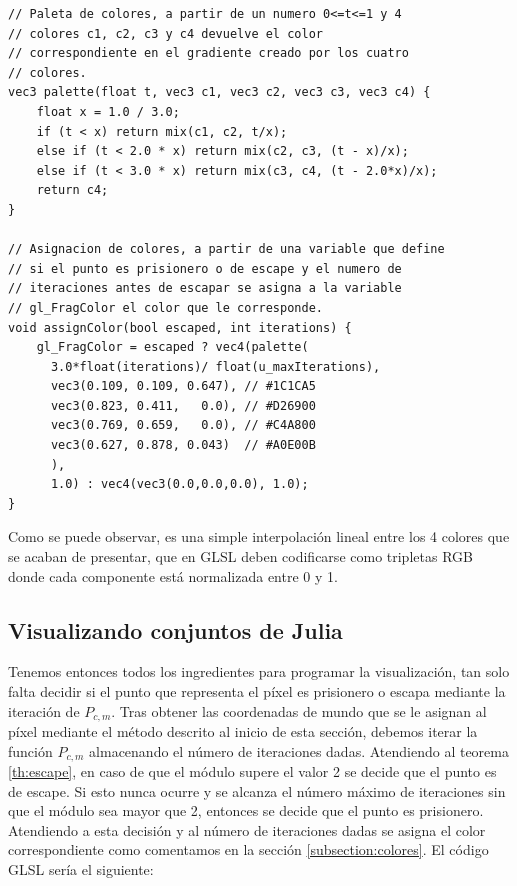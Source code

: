 \begin{lstlisting}
// Paleta de colores, a partir de un numero 0<=t<=1 y 4 
// colores c1, c2, c3 y c4 devuelve el color 
// correspondiente en el gradiente creado por los cuatro 
// colores.
vec3 palette(float t, vec3 c1, vec3 c2, vec3 c3, vec3 c4) {
    float x = 1.0 / 3.0;
    if (t < x) return mix(c1, c2, t/x);
    else if (t < 2.0 * x) return mix(c2, c3, (t - x)/x);
    else if (t < 3.0 * x) return mix(c3, c4, (t - 2.0*x)/x);
    return c4;
}

// Asignacion de colores, a partir de una variable que define
// si el punto es prisionero o de escape y el numero de 
// iteraciones antes de escapar se asigna a la variable 
// gl_FragColor el color que le corresponde.
void assignColor(bool escaped, int iterations) {
    gl_FragColor = escaped ? vec4(palette(
      3.0*float(iterations)/ float(u_maxIterations),
      vec3(0.109, 0.109, 0.647), // #1C1CA5
      vec3(0.823, 0.411,   0.0), // #D26900
      vec3(0.769, 0.659,   0.0), // #C4A800
      vec3(0.627, 0.878, 0.043)  // #A0E00B
      ), 
      1.0) : vec4(vec3(0.0,0.0,0.0), 1.0);
}
\end{lstlisting}

Como se puede observar, es una simple interpolación lineal entre los 4 colores que se acaban de presentar, que en GLSL deben codificarse como tripletas RGB donde cada componente está normalizada entre 0 y 1.

\subsection{Visualizando conjuntos de Julia}
\label{subsection:grafica-julia}

Tenemos entonces todos los ingredientes para programar la visualización, tan solo falta decidir si el punto que representa el píxel es prisionero o escapa mediante la iteración de $P_{c,m}$. Tras obtener las coordenadas de mundo que se le asignan al píxel mediante el método descrito al inicio de esta sección, debemos iterar la función $P_{c,m}$ almacenando el número de iteraciones dadas. Atendiendo al teorema \ref{th:escape}, en caso de que el módulo supere el valor 2 se decide que el punto es de escape. Si esto nunca ocurre y se alcanza el número máximo de iteraciones sin que el módulo sea mayor que 2, entonces se decide que el punto es prisionero. Atendiendo a esta decisión y al número de iteraciones dadas se asigna el color correspondiente como comentamos en la sección \ref{subsection:colores}. El código GLSL sería el siguiente:

